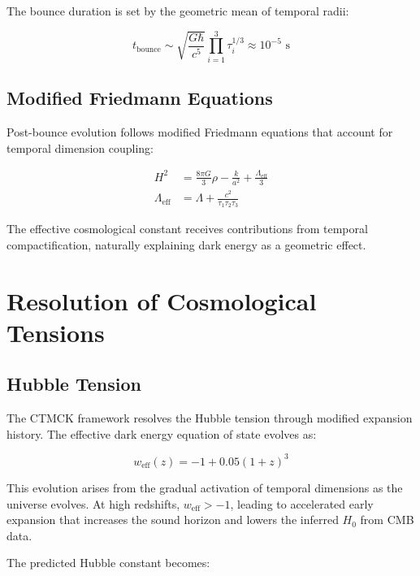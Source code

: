 \documentclass[reprint,amsmath,amssymb,aps,prd,nofootinbib,longbibliography]{revtex4-2}
\begin{document}
The bounce duration is set by the geometric mean of temporal radii:

\begin{equation}
t_{\text{bounce}} \sim \sqrt{\frac{G\hbar}{c^5}} \prod_{i=1}^{3} \tau_i^{1/3} \approx 10^{-5} \text{ s}
\label{eq:bounce_time}
\end{equation}

\subsection{Modified Friedmann Equations}

Post-bounce evolution follows modified Friedmann equations that account for temporal dimension coupling:

\begin{align}
H^2 &= \frac{8\pi G}{3} \rho - \frac{k}{a^2} + \frac{\Lambda_{\text{eff}}}{3} \\
\Lambda_{\text{eff}} &= \Lambda + \frac{c^2}{\tau_1 \tau_2 \tau_3}
\end{align}

The effective cosmological constant receives contributions from temporal compactification, naturally explaining dark energy as a geometric effect.

\section{Resolution of Cosmological Tensions}

\subsection{Hubble Tension}

The CTMCK framework resolves the Hubble tension through modified expansion history. The effective dark energy equation of state evolves as:

\begin{equation}
w_{\text{eff}}(z) = -1 + 0.05 (1+z)^3
\label{eq:w_evolution}
\end{equation}

This evolution arises from the gradual activation of temporal dimensions as the universe evolves. At high redshifts, $w_{\text{eff}} > -1$, leading to accelerated early expansion that increases the sound horizon and lowers the inferred $H_0$ from CMB data.

The predicted Hubble constant becomes:
\end{document}

